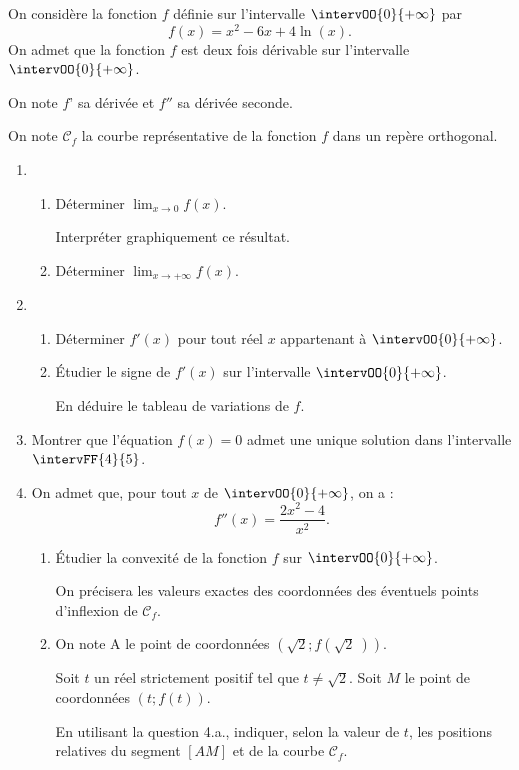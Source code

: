 On considère la fonction $f$ définie sur l'intervalle $\intervOO{0}{+\infty}$ par \[f(x) = x^2 - 6x + 4\ln (x).\]
On admet que la fonction $f$ est deux fois dérivable sur l'intervalle $\intervOO{0}{+\infty}$.

On note $f$' sa dérivée et $f''$ sa dérivée seconde.

On note $\mathcal{C}_f$ la courbe représentative de la fonction $f$ dans un repère orthogonal.

\begin{enumerate}
	\item 
	\begin{enumerate}
		\item Déterminer $\displaystyle\lim_{x \to 0} f(x)$. 
		
		Interpréter graphiquement ce résultat.
		\item Déterminer $\displaystyle\lim_{x \to + \infty} f(x)$.
	\end{enumerate}
	\item
	\begin{enumerate}
		\item Déterminer $f'(x)$ pour tout réel $x$ appartenant à $\intervOO{0}{+\infty}$.
		\item Étudier le signe de $f'(x)$ sur l'intervalle $\intervOO{0}{+\infty}$.
		
		En déduire le tableau de variations de $f$.
	\end{enumerate}
	\item Montrer que l'équation $f(x) = 0$ admet une unique solution dans l'intervalle $\intervFF{4}{5}$.
	\item On admet que, pour tout $x$ de $\intervOO{0}{+\infty}$, on a : \[f''(x) = \dfrac{2x^2 - 4}{x^2}.\]
	\begin{enumerate}
		\item Étudier la convexité de la fonction $f$ sur $\intervOO{0}{+\infty}$. 
		
		On précisera les valeurs exactes des coordonnées des éventuels points d'inflexion de $\mathcal{C}_f$. 
		\item On note A le point de coordonnées $\left(\sqrt 2;f\left(\sqrt 2~\right)\right)$.
		
		Soit $t$ un réel strictement positif tel que $t \ne \sqrt 2$. Soit $M$ le point de coordonnées $(t;f(t))$.
		
		En utilisant la question 4.a., indiquer, selon la valeur de $t$, les positions relatives du segment $[AM]$ et de la courbe $\mathcal{C}_f$.
	\end{enumerate}
\end{enumerate}

